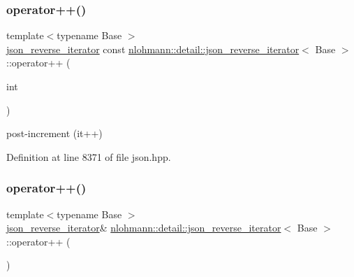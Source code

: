 \subsubsection{\texorpdfstring{operator++()}{operator++()}\hspace{0.1cm}{\footnotesize\ttfamily [1/2]}}
{\footnotesize\ttfamily template$<$typename Base $>$ \\
\mbox{\hyperlink{classnlohmann_1_1detail_1_1json__reverse__iterator}{json\+\_\+reverse\+\_\+iterator}} const \mbox{\hyperlink{classnlohmann_1_1detail_1_1json__reverse__iterator}{nlohmann\+::detail\+::json\+\_\+reverse\+\_\+iterator}}$<$ Base $>$\+::operator++ (\begin{DoxyParamCaption}\item[{int}]{ }\end{DoxyParamCaption})\hspace{0.3cm}{\ttfamily [inline]}}



post-\/increment (it++) 



Definition at line 8371 of file json.\+hpp.

\mbox{\label{classnlohmann_1_1detail_1_1json__reverse__iterator_a26caf0069a50ce4ecb010a1453e883fc}} 
\subsubsection{\texorpdfstring{operator++()}{operator++()}\hspace{0.1cm}{\footnotesize\ttfamily [2/2]}}
{\footnotesize\ttfamily template$<$typename Base $>$ \\
\mbox{\hyperlink{classnlohmann_1_1detail_1_1json__reverse__iterator}{json\+\_\+reverse\+\_\+iterator}}\& \mbox{\hyperlink{classnlohmann_1_1detail_1_1json__reverse__iterator}{nlohmann\+::detail\+::json\+\_\+reverse\+\_\+iterator}}$<$ Base $>$\+::operator++ (\begin{DoxyParamCaption}{ }\end{DoxyParamCaption})\hspace{0.3cm}{\ttfamily [inline]}}




